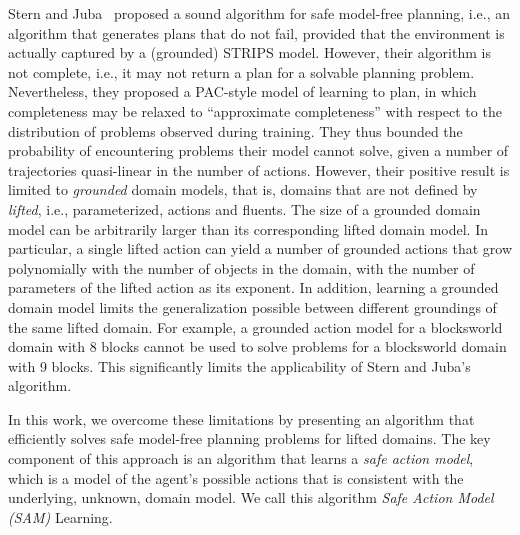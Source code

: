 \documentclass{article}
\begin{document}
Stern and Juba~ proposed a sound algorithm for safe model-free planning, i.e., an algorithm that generates plans that do not fail, provided that the environment is actually captured by a (grounded) STRIPS model. 
However, their algorithm is not complete, i.e., it may not return a plan for a solvable planning problem. 
Nevertheless, they proposed a PAC-style model of learning to plan, in which completeness may be relaxed to ``approximate completeness'' with respect to the distribution of problems observed during training. They thus bounded the probability of encountering problems their model cannot solve, given a number of trajectories quasi-linear in the number of actions.
However, their positive result is limited to \emph{grounded} domain models, that is, domains that are not defined by \emph{lifted}, i.e., parameterized, actions and fluents. 
The size of a grounded domain model can be arbitrarily larger than its corresponding lifted domain model. In particular, a single lifted action can yield a number of grounded actions that grow polynomially with the number of objects in the domain, with the number of parameters of the lifted action as its exponent. 
In addition, learning a grounded domain model limits the  generalization possible between different groundings of the same lifted domain. For example, a grounded action model for a blocksworld domain with 8 blocks cannot be used to solve problems for a blocksworld domain with 9 blocks.  
This significantly limits the applicability of Stern and Juba's algorithm. 





In this work, we overcome these limitations by presenting an algorithm that efficiently solves safe model-free planning problems for lifted domains. 
The key component of this approach is an algorithm that learns a \emph{safe action model}, which is a model of the agent's possible actions that is consistent with the underlying, unknown, domain  model. We call this algorithm \emph{Safe Action Model (SAM)} Learning. 
\end{document}
